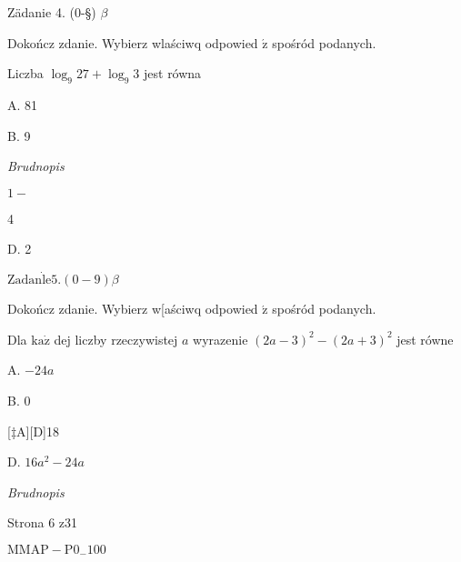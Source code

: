 \documentclass[a4paper,12pt]{article}
\begin{document}
Zädanie 4. (0-\S) $\beta$

Dokończ zdanie. Wybierz wlaściwq odpowied $\acute{\mathrm{z}}$ spośród podanych.

Liczba $\log_{9}27+\log_{9}3$ jest równa

A. 81

B. 9

{\it Brudnopis}

$1-$

4

D. 2

$\mathrm{Z}\mathrm{a}\mathrm{d}\mathrm{a}\mathrm{n}\dot{\mathrm{l}}\mathrm{e}5. (0-9) \beta$

Dokończ zdanie. Wybierz w[aściwq odpowied $\acute{\mathrm{z}}$ spośród podanych.

Dla $\mathrm{k}\mathrm{a}\dot{\mathrm{z}}$ dej liczby rzeczywistej $a$ wyrazenie $(2a-3)^{2}-(2a+3)^{2}$ jest równe

A. $-24a$

B. 0

[‡A][D]18

D. $16a^{2}-24a$

{\it Brudnopis}

Strona 6 z31

$\mathrm{M}\mathrm{M}\mathrm{A}\mathrm{P}-\mathrm{P}0_{-}100$
\end{document}

